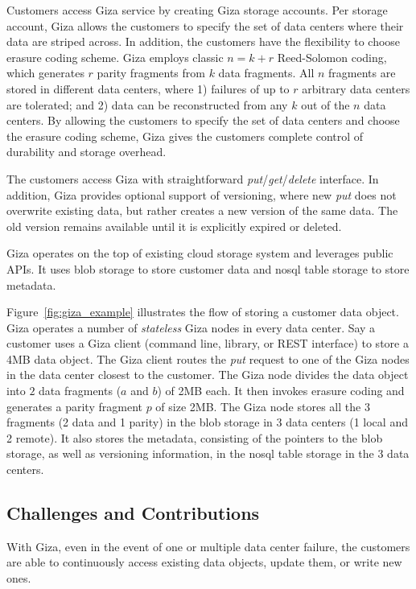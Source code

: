 Customers access Giza service by creating Giza storage accounts. Per storage account, Giza allows the customers to specify the set of data centers where their data are striped across. In addition, the customers have the flexibility to choose erasure coding scheme. Giza employs classic $n = k + r$ Reed-Solomon coding, which generates $r$ parity fragments from $k$ data fragments. All $n$ fragments are stored in different data centers, where 1) failures of up to $r$ arbitrary data centers are tolerated; and 2) data can be reconstructed from any $k$ out of the $n$ data centers. By allowing the customers to specify the set of data centers and choose the erasure coding scheme, Giza gives the customers complete control of durability and storage overhead.

The customers access Giza with straightforward {\em put}/{\em get}/{\em delete} interface. In addition, Giza provides optional support of versioning, where new {\em put} does not overwrite existing data, but rather creates a new version of the same data. The old version remains available until it is explicitly expired or deleted.

Giza operates on the top of existing cloud storage system and leverages public APIs. It uses blob storage to store customer data and nosql table storage to store metadata.

Figure~\ref{fig:giza_example} illustrates the flow of storing a customer data object. Giza operates a number of {\em stateless} Giza nodes in every data center. Say a customer uses a Giza client (command line, library, or REST interface) to store a 4MB data object. The Giza client routes the {\em put} request to one of the Giza nodes in the data center closest to the customer. The Giza node divides the data object into $2$ data fragments ($a$ and $b$) of 2MB each. It then invokes erasure coding and generates a parity fragment $p$ of size 2MB. The Giza node stores all the $3$ fragments (2 data and 1 parity) in the blob storage in 3 data centers (1 local and 2 remote). It also stores the metadata, consisting of the pointers to the blob storage, as well as versioning information, in the nosql table storage in the 3 data centers.

\subsection{Challenges and Contributions}

With Giza, even in the event of one or multiple data center failure, the customers are able to continuously access existing data objects, update them, or write new ones.

